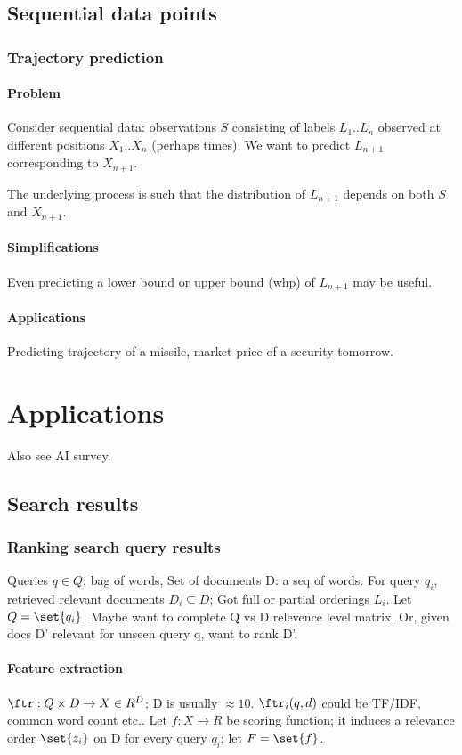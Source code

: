 \documentclass[oneside, article]{memoir}
\begin{document}
\chapter{Sequential data points}
\section{Trajectory prediction}
\subsection{Problem}
Consider sequential data: observations $S$ consisting of labels $L_1 .. L_n$ observed at different positions $X_1.. X_n$ (perhaps times). We want to predict $L_{n+1}$ corresponding to $X_{n+1}$.

The underlying process is such that the distribution of $L_{n+1}$ depends on both $S$ and $X_{n+1}$. 

\subsection{Simplifications}
Even predicting a lower bound or upper bound (whp) of $L_{n+1}$ may be useful.

\subsection{Applications}
Predicting trajectory of a missile, market price of a security tomorrow.

\part{Applications}
Also see AI survey.

\chapter{Search results}
\section{Ranking search query results}
Queries $q \in Q$: bag of words, Set of documents D: a seq of words. For query $q_{i}$, retrieved relevant documents $D_{i} \subseteq D$; Got full or partial orderings $L_{i}$. Let $Q = \set{q_{i}}$. Maybe want to complete Q vs D relevence level matrix. Or, given docs D' relevant for unseen query q, want to rank D'.

\subsection{Feature extraction}
$\ftr: Q \times D \to X \in R^{D}$; D is usually $\approx 10$. $\ftr_{i}(q,d)$ could be TF/IDF, common word count etc.. Let $f:X \to R$ be scoring function; it induces a relevance order $\set{z_{i}}$ on D for every query $q_{i}$; let $F = \set{f}$.
\end{document}
